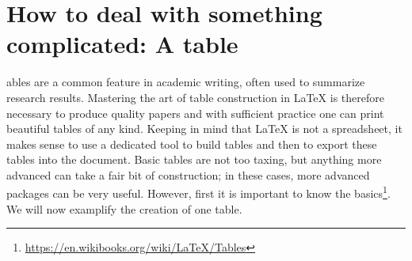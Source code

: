 \section{How to deal with something complicated: A table}
ables are a common feature in academic writing, often used to summarize research results. Mastering the art of table construction in LaTeX is therefore necessary to produce quality papers and with sufficient practice one can print beautiful tables of any kind. Keeping in mind that LaTeX is not a spreadsheet, it makes sense to use a dedicated tool to build tables and then to export these tables into the document. Basic tables are not too taxing, but anything more advanced can take a fair bit of construction; in these cases, more advanced packages can be very useful. However, first it is important to know the basics\footnote{\url{https://en.wikibooks.org/wiki/LaTeX/Tables}}.
We will now examplify the creation of one table.


